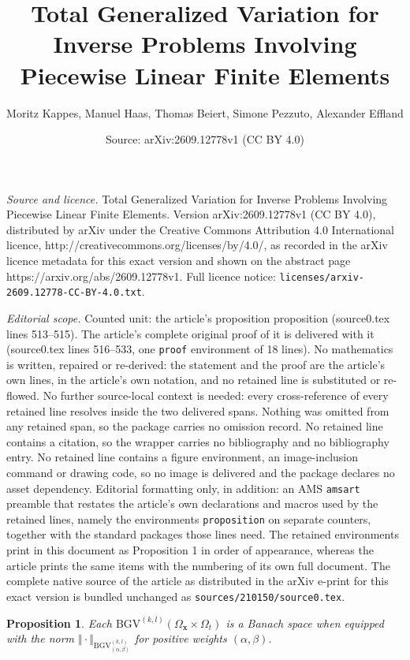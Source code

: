\documentclass[10pt,a4paper]{amsart}
\title{Total Generalized Variation for Inverse Problems Involving Piecewise Linear Finite Elements}
\author{Moritz Kappes, Manuel Haas, Thomas Beiert, Simone Pezzuto, Alexander Effland}
\date{Source: arXiv:2609.12778v1 (CC BY 4.0)}
\newtheorem{proposition}{Proposition}
\newcommand{\BGV}{\mathrm{BGV}}
\newcommand{\OmegaSpace}{\Omega_\mathbf{x}}
\newcommand{\OmegaTime}{\Omega_t}
\begin{document}
\maketitle

\noindent\emph{Source and licence.} Total Generalized Variation for Inverse Problems Involving Piecewise Linear Finite Elements. Version arXiv:2609.12778v1 (CC BY 4.0), distributed by arXiv under the Creative Commons Attribution 4.0 International licence, http://creativecommons.org/licenses/by/4.0/, as recorded in the arXiv licence metadata for this exact version and shown on the abstract page https://arxiv.org/abs/2609.12778v1. Full licence notice: \texttt{licenses/arxiv-2609.12778-CC-BY-4.0.txt}.\par\smallskip

\noindent\textit{Editorial scope.} Counted unit: the article's proposition proposition (source0.tex lines 513--515). The article's complete original proof of it is delivered with it (source0.tex lines 516--533, one \texttt{proof} environment of 18 lines). No mathematics is written, repaired or re-derived: the statement and the proof are the article's own lines, in the article's own notation, and no retained line is substituted or re-flowed.  No further source-local context is needed: every cross-reference of every retained line resolves inside the two delivered spans.  Nothing was omitted from any retained span, so the package carries no omission record.  No retained line contains a citation, so the wrapper carries no bibliography and no bibliography entry.  No retained line contains a figure environment, an image-inclusion command or drawing code, so no image is delivered and the package declares no asset dependency.  Editorial formatting only, in addition: an AMS \texttt{amsart} preamble that restates the article's own declarations and macros used by the retained lines, namely the environments \texttt{proposition} on separate counters, together with the standard packages those lines need.  The retained environments print in this document as Proposition 1 in order of appearance, whereas the article prints the same items with the numbering of its own full document.  The complete native source of the article as distributed in the arXiv e-print for this exact version is bundled unchanged as \texttt{sources/210150/source0.tex}.
	\begin{proposition}
		Each $\BGV^{(k,l)}(\OmegaSpace \times\OmegaTime)$ is a Banach space when equipped with the norm $\Vert \cdot\Vert _{\BGV_{(\alpha, \beta)}^{(k,l)}}$ for positive weights $(\alpha, \beta)$.
	\end{proposition}
\end{document}
